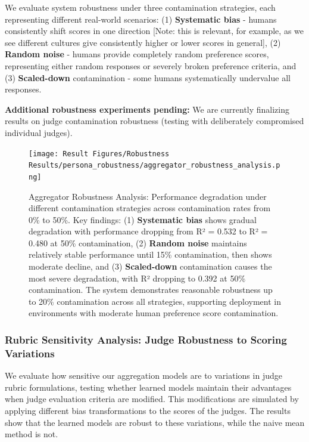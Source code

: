 We evaluate system robustness under three contamination strategies, each representing different real-world scenarios: (1) \textbf{Systematic bias} - humans consistently shift scores in one direction [Note: this is relevant, for example, as we see different cultures give consistently higher or lower scores in general], (2) \textbf{Random noise} - humans provide completely random preference scores, representing either random responses or severely broken preference criteria, and (3) \textbf{Scaled-down} contamination - some humans systematically undervalue all responses.

\textbf{Additional robustness experiments pending:} We are currently finalizing results on judge contamination robustness (testing with deliberately compromised individual judges).

\begin{figure}[htbp]
    \centering
    \texttt{[image: Result Figures/Robustness Results/persona\_robustness/aggregator\_robustness\_analysis.png]}
    \caption{Aggregator Robustness Analysis: Performance degradation under different contamination strategies across contamination rates from 0\% to 50\%. Key findings: (1) \textbf{Systematic bias} shows gradual degradation with performance dropping from R² = 0.532 to R² = 0.480 at 50\% contamination, (2) \textbf{Random noise} maintains relatively stable performance until 15\% contamination, then shows moderate decline, and (3) \textbf{Scaled-down} contamination causes the most severe degradation, with R² dropping to 0.392 at 50\% contamination. The system demonstrates reasonable robustness up to 20\% contamination across all strategies, supporting deployment in environments with moderate human preference score contamination.}
    \label{fig:robustness_analysis}
\end{figure}

\subsubsection{Rubric Sensitivity Analysis: Judge Robustness to Scoring Variations}

We evaluate how sensitive our aggregation models are to variations in judge rubric formulations, testing whether learned models maintain their advantages when judge evaluation criteria are modified. This modifications are simulated by applying different bias transformations to the scores of the judges. The results show that the learned models are robust to these variations, while the naive mean method is not.

